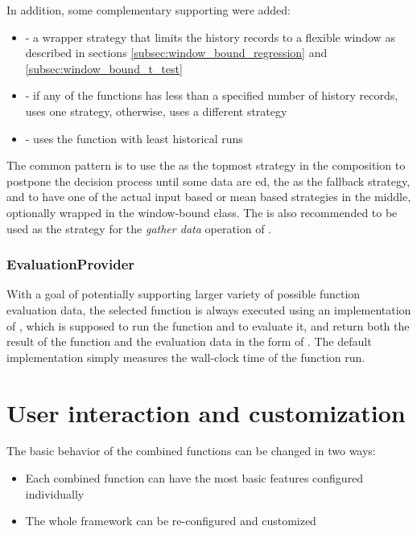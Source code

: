 In addition, some complementary supporting were added:
\begin{itemize}
	\item {} - a wrapper strategy that limits the history records to a flexible window as described in sections \ref{subsec:window_bound_regression} and \ref{subsec:window_bound_t_test}
\item {} - if any of the functions has less than a specified number of history records, uses one strategy, otherwise, uses a different strategy
\item {} - uses the function with least historical runs
\end{itemize}

The common pattern is to use the  as the topmost strategy in the composition to postpone the decision process until some data are ed, the  as the fallback strategy, and to have one of the actual input based or mean based strategies in the middle, optionally wrapped in the window-bound class. The  is also recommended to be used as the strategy for the \textit{gather data} operation of .

\subsubsection{EvaluationProvider}

With a goal of potentially supporting larger variety of possible function evaluation data, the selected function is always executed using an implementation of , which is supposed to run the function and to evaluate it, and return both the result of the function and the evaluation data in the form of . The default implementation simply measures the wall-clock time of the function run.

\section{User interaction and customization}

The basic behavior of the combined functions can be changed in two ways:
\begin{itemize}
	\item Each combined function can have the most basic features configured individually
	\item The whole framework can be re-configured and customized
\end{itemize}


